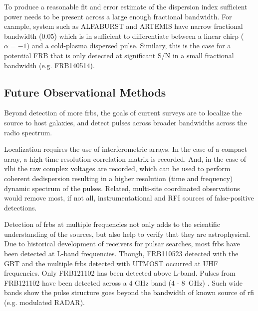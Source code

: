 \documentclass[a4paper,fleqn,usenatbib]{mnras}
\begin{document}

To produce a reasonable fit and error estimate of the dispersion index
sufficient power needs to be present across a large enough fractional bandwidth.
For example, system such as ALFABURST and ARTEMIS have narrow fractional
bandwidth ($0.05$) which is in sufficient to differentiate between a linear
chirp ($\alpha = -1$) and a cold-plasma dispersed pulse. Similary, this is the
case for a potential FRB that is only detected at significant S/N in a small
fractional bandwidth (e.g. FRB140514).

\subsection{Future Observational Methods}

Beyond detection of more \glspl{frb}, the goals of current surveys are to
localize the source to host galaxies, and detect pulses across broader
bandwidths across the radio spectrum.

Localization requires the use of interferometric arrays. In the case of a
compact array, a high-time resolution correlation matrix is recorded. And, in
the case of \gls{vlbi} the raw complex voltages are recorded, which can be used
to perform coherent dedispersion resulting in a higher resolution (time and
frequency) dynamic spectrum of the pulses.  Related, multi-site coordinated
observations would remove most, if not all, instrumentational and RFI sources of
false-positive detections.

Detection of \glspl{frb} at multiple frequencies not only adds to the scientific
understanding of the sources, but also help to verify that they are
astrophysical.  Due to historical development of receivers for pulsar searches,
most \glspl{frb} have been detected at L-band frequencies. Though, FRB110523
detected with the GBT and the multiple \glspl{frb} detected with UTMOST occurred
at UHF frequencies.  Only FRB121102 has been detected above L-band.  Pulses from
FRB121102 have been detected across a 4 GHz band (4 - 8~GHz) \citep{atel10675}.
Such wide bands show the pulse structure goes beyond the bandwidth of known
source of \gls{rfi} (e.g. modulated RADAR).
\end{document}
